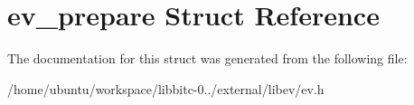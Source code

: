 \hypertarget{structev__prepare}{\section{ev\-\_\-prepare Struct Reference}
\label{structev__prepare}
}


The documentation for this struct was generated from the following file\-:\begin{DoxyCompactItemize}
\item 
/home/ubuntu/workspace/libbitc-\/0../external/libev/ev.\-h\end{DoxyCompactItemize}
